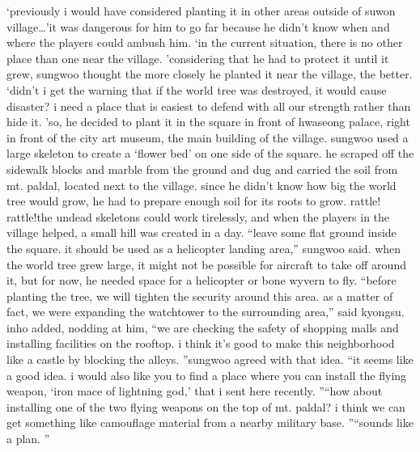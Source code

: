 ‘previously i would have considered planting it in other areas outside of suwon village…’it was dangerous for him to go far because he didn’t know when and where the players could ambush him.
‘in the current situation, there is no other place than one near the village.
’considering that he had to protect it until it grew, sungwoo thought the more closely he planted it near the village, the better.
‘didn’t i get the warning that if the world tree was destroyed, it would cause disaster? i need a place that is easiest to defend with all our strength rather than hide it.
’so, he decided to plant it in the square in front of hwaseong palace, right in front of the city art museum, the main building of the village.
sungwoo used a large skeleton to create a ‘flower bed’ on one side of the square.
he scraped off the sidewalk blocks and marble from the ground and dug and carried the soil from mt.
 paldal, located next to the village.
 since he didn’t know how big the world tree would grow, he had to prepare enough soil for its roots to grow.
rattle! rattle!the undead skeletons could work tirelessly, and when the players in the village helped, a small hill was created in a day.
“leave some flat ground inside the square.
 it should be used as a helicopter landing area,” sungwoo said.
when the world tree grew large, it might not be possible for aircraft to take off around it, but for now, he needed space for a helicopter or bone wyvern to fly.
“before planting the tree, we will tighten the security around this area.
 as a matter of fact, we were expanding the watchtower to the surrounding area,” said kyongsu.
inho added, nodding at him, “we are checking the safety of shopping malls and installing facilities on the rooftop.
 i think it’s good to make this neighborhood like a castle by blocking the alleys.
”sungwoo agreed with that idea.
“it seems like a good idea.
 i would also like you to find a place where you can install the flying weapon, ‘iron mace of lightning god,’ that i sent here recently.
”“how about installing one of the two flying weapons on the top of mt.
 paldal? i think we can get something like camouflage material from a nearby military base.
”“sounds like a plan.
”

 